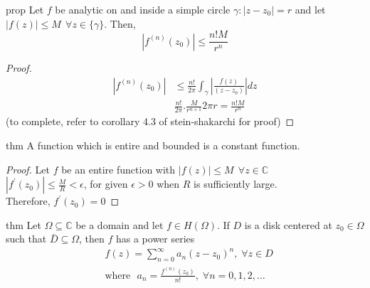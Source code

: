 \begin{restatable}{prop}{}\label{}
Let $f$ be analytic on and inside a simple circle $\gamma: |z-z_0|=r$ and let $|f(z)|\leq M \:\:\forall z\in \{\gamma\}$. Then,\\
\begin{equation*}
    |f^{(n)}(z_0)|\leq \frac{n!M}{r^n}
\end{equation*}
\end{restatable}
\begin{proof}
\begin{equation*}
    \begin{split}
        |f^{(n)}(z_0)|&\leq \frac{n!}{2\pi}\int_{\gamma}^{} |\frac{f(z)}{(z-z_0)}| dz \\
        & \frac{n!}{2\pi}.\frac{M}{r^{n+1}}2\pi r=\frac{n!M}{r^n}
    \end{split}
\end{equation*}
(to complete, refer to corollary 4.3 of stein-shakarchi for proof)
\end{proof}
\begin{restatable}{thm}{}\label{}
A function which is entire and bounded is a constant function.
\end{restatable}
\begin{proof}
Let $f$ be an entire function with $|f(z)|\leq M \:\:\forall z\in\mathds{C}$\\
$|f^{'}(z_0)|\leq \frac{M}{R} < \epsilon$, for given $\epsilon>0$ when $R$ is sufficiently large.\\
Therefore, $f^{'}(z_0)=0$
\end{proof}
\begin{restatable}[]{thm}{}\label{}
Let $\Omega\subseteq \mathds{C}$ be a domain and let $f\in H(\Omega)$. If $D$ is a disk centered at $z_0\in \Omega$ such that $\bar{D}\subseteq \Omega$, then $f$ has a power series\\
\begin{equation*}
    \begin{split}
        &f(z)=\sum_{n=0}^{\infty} a_n(z-z_0)^n\text{,}\:\: \forall z\in D\\
        &\text{where}\:\:\: a_n=\frac{f^{(n)}(z_0)}{n!}\text{,} \:\: \forall n=0,1,2,\dots
    \end{split}
\end{equation*}
\end{restatable}
